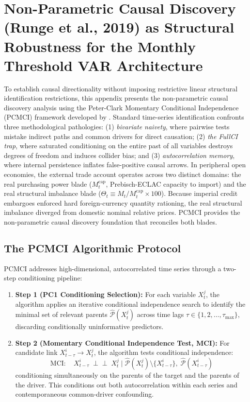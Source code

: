 \section{Non-Parametric Causal Discovery (Runge et al., 2019) as Structural Robustness for the Monthly Threshold VAR Architecture}
\label{app:causal_pcmci}

To establish causal directionality without imposing restrictive linear structural identification restrictions, this appendix presents the non-parametric causal discovery analysis using the Peter-Clark Momentary Conditional Independence (PCMCI) framework developed by \citet{Runge2019}. Standard time-series identification confronts three methodological pathologies: (1) \emph{bivariate naivety}, where pairwise tests mistake indirect paths and common drivers for direct causation; (2) \emph{the FullCI trap}, where saturated conditioning on the entire past of all variables destroys degrees of freedom and induces collider bias; and (3) \emph{autocorrelation memory}, where internal persistence inflates false-positive causal arrows. In peripheral open economies, the external trade account operates across two distinct domains: the real purchasing power blade ($M^{\text{cap}}_t$, Prebisch-ECLAC capacity to import) and the real structural imbalance blade ($\Theta_t \equiv M_t / M^{\text{cap}}_t \times 100$). Because imperial credit embargoes enforced hard foreign-currency quantity rationing, the real structural imbalance diverged from domestic nominal relative prices. PCMCI provides the non-parametric causal discovery foundation that reconciles both blades.

\subsection{The PCMCI Algorithmic Protocol}
\label{app:pcmci_protocol}

PCMCI addresses high-dimensional, autocorrelated time series through a two-step conditioning pipeline:
\begin{enumerate}[leftmargin=2em]
	\item \textbf{Step 1 (PC1 Conditioning Selection):} For each variable $X^j_t$, the algorithm applies an iterative conditional independence search to identify the minimal set of relevant parents $\hat{\mathcal{P}}(X^j_t)$ across time lags $\tau \in \{1, 2, \dots, \tau_{\max}\}$, discarding conditionally uninformative predictors.
	\item \textbf{Step 2 (Momentary Conditional Independence Test, MCI):} For candidate link $X^i_{t-\tau} \to X^j_t$, the algorithm tests conditional independence:
	\begin{equation}
		\text{MCI}: \quad X^i_{t-\tau} \;\perp\!\!\!\perp\; X^j_t \;\big|\; \hat{\mathcal{P}}(X^j_t) \setminus \{X^i_{t-\tau}\}, \; \hat{\mathcal{P}}(X^i_{t-\tau})
		\label{eq:mci_test}
	\end{equation}
	conditioning simultaneously on the parents of the target and the parents of the driver. This conditions out both autocorrelation within each series and contemporaneous common-driver confounding.
\end{enumerate}

